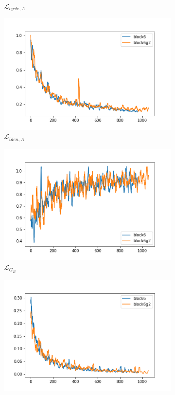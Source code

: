 \documentclass{beamer}
\begin{document}
\begin{frame}
\begin{figure}[htb]
\begin{subfigure}[b]{0.23\linewidth}
        \caption{$\mathcal{L}_{cycle,A}$}
      \end{subfigure}
      \begin{subfigure}[b]{0.23\linewidth}
        \includegraphics[width=\linewidth]{exp6_idt_A.png}
        \caption{$\mathcal{L}_{iden,A}$}
      \end{subfigure}
      \begin{subfigure}[b]{0.23\linewidth}
        \includegraphics[width=\linewidth]{exp6_G_B.png}
        \caption{$\mathcal{L}_{G_B}$}
      \end{subfigure}
      \begin{subfigure}[b]{0.23\linewidth}
        \includegraphics[width=\linewidth]{exp6_D_B.png}

\end{subfigure}
\end{figure}
\end{frame}
\end{document}
